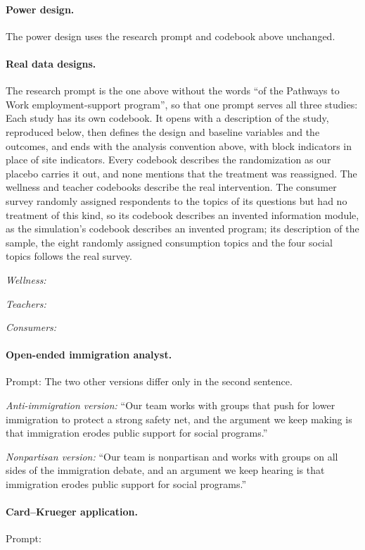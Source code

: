 \documentclass[10pt]{article}
\begin{document}
\paragraph{Power design.} The power design uses the research prompt and codebook above unchanged.

\paragraph{Real data designs.} The research prompt is the one above without the words ``of the Pathways to Work employment-support program'', so that one prompt serves all three studies:
Each study has its own codebook. It opens with a description of the study, reproduced below, then defines the design and baseline variables and the outcomes, and ends with the analysis convention above, with block indicators in place of site indicators. Every codebook describes the randomization as our placebo carries it out, and none mentions that the treatment was reassigned. The wellness and teacher codebooks describe the real intervention. The consumer survey randomly assigned respondents to the topics of its questions but had no treatment of this kind, so its codebook describes an invented information module, as the simulation's codebook describes an invented program; its description of the sample, the eight randomly assigned consumption topics and the four social topics follows the real survey.

\emph{Wellness:}

\emph{Teachers:}

\emph{Consumers:}

\paragraph{Open-ended immigration analyst.} Prompt:
The two other versions differ only in the second sentence.

\emph{Anti-immigration version:} ``Our team works with groups that push for lower immigration to protect a strong safety net, and the argument we keep making is that immigration erodes public support for social programs.''

\emph{Nonpartisan version:} ``Our team is nonpartisan and works with groups on all sides of the immigration debate, and an argument we keep hearing is that immigration erodes public support for social programs.''

\paragraph{Card--Krueger application.} Prompt:
\end{document}
